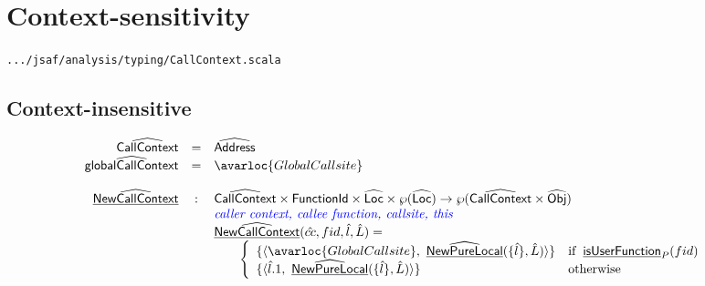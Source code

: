 \newpage
\section{Context-sensitivity}\label{sec:context-sensitivity}
{\inblue\tt .../jsaf/analysis/typing/CallContext.scala}\\

\subsection{Context-insensitive}
\[
\begin{array}{rcl}
\abs{CallContext} & = & \abs{Address} \\
\abs{globalCallContext} & = & \avarloc{GlobalCallsite} \\
\\

\ahf{NewCallContext} & : & \abs{CallContext} \times \SF{FunctionId} \times \abs{Loc} \times \powerset{\abs{Loc}} \rightarrow \powerset{\abs{CallContext} \times \abs{Obj}} \\
& & \comment{\inblue caller context, callee function, callsite, this}  \\
& & \ahf{NewCallContext}(\hat{cc}, fid, \hat{l}, \hat{L}) = \\
& & \quad\quad \left\{
       \begin{array}{ll}
         \{ \langle \avarloc{GlobalCallsite}, ~ \ahf{NewPureLocal}(\{\hat{l}\}, \hat{L}) \rangle \} & \ifc{\chf{isUserFunction}_P(fid)} \\
         \{ \langle \hat{l}.1, ~ \ahf{NewPureLocal}(\{\hat{l}\}, \hat{L}) \rangle \} & \owc \\
       \end{array}
     \right.\\
\end{array}
\]


